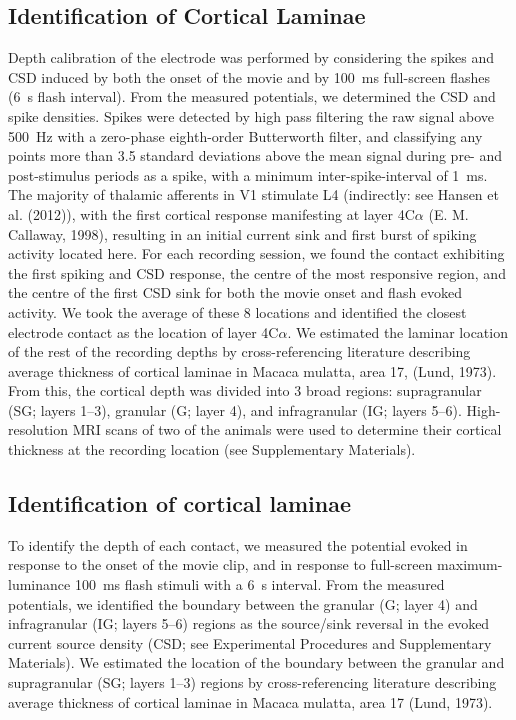 \subsection{Identification of Cortical Laminae}
Depth calibration of the electrode was performed by considering the spikes and \ac{CSD} induced by both the onset of the movie and by \SI{100}{ms} full-screen flashes (\SI{6}{s} flash interval).
From the measured potentials, we determined the \ac{CSD} and spike densities.
Spikes were detected by high pass filtering the raw signal above \SI{500}{Hz} with a zero-phase eighth-order Butterworth filter, and classifying any points more than 3.5 standard deviations above the mean signal during pre- and post-stimulus periods as a spike, with a minimum inter-spike-interval of \SI{1}{ms}.
The majority of thalamic afferents in \ac{V1} stimulate \ac{L4} (indirectly: see Hansen et al. (2012)), with the first cortical response manifesting at layer 4C$\alpha$ (E. M. Callaway, 1998), resulting in an initial current sink and first burst of spiking activity located here.
For each recording session, we found the contact exhibiting the first spiking and \ac{CSD} response, the centre of the most responsive region, and the centre of the first \ac{CSD} sink for both the movie onset and flash evoked activity.
We took the average of these 8 locations and identified the closest electrode contact as the location of layer 4C$\alpha$.
We estimated the laminar location of the rest of the recording depths by cross-referencing literature describing average thickness of cortical laminae in Macaca mulatta, area 17, (Lund, 1973).
From this, the cortical depth was divided into 3 broad regions: supragranular (SG; layers 1--3), granular (G; layer 4), and infragranular (IG; layers 5--6).
High-resolution \ac{MRI} scans of two of the animals were used to determine their cortical thickness at the recording location (see Supplementary Materials).

\subsection{Identification of cortical laminae}
To identify the depth of each contact, we measured the potential evoked in response to the onset of the movie clip, and in response to full-screen maximum-luminance \SI{100}{ms} flash stimuli with a \SI{6}{s} interval.
From the measured potentials, we identified the boundary between the granular (G; layer 4) and infragranular (IG; layers 5--6) regions as the source/sink reversal in the evoked current source density (\ac{CSD}; see Experimental Procedures and Supplementary Materials).
We estimated the location of the boundary between the granular and supragranular (SG; layers 1--3) regions by cross-referencing literature describing average thickness of cortical laminae in Macaca mulatta, area 17 (Lund, 1973).

